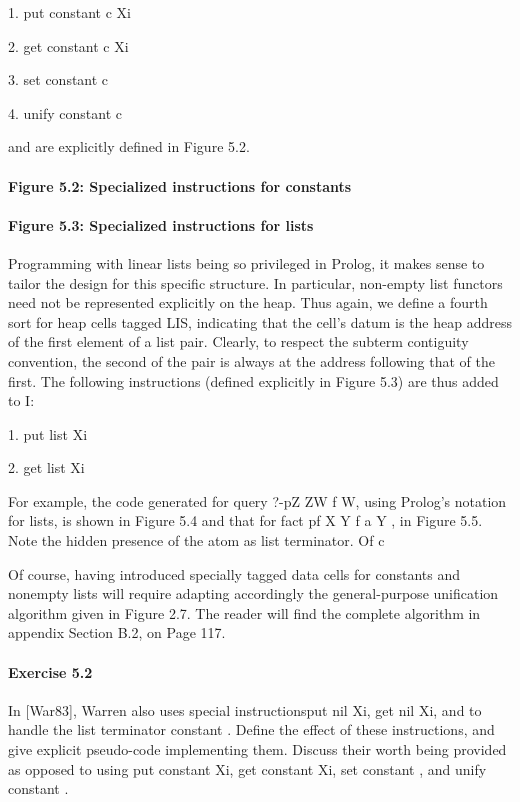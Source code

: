 1. put constant c Xi

2. get constant c Xi

3. set constant c

4. unify constant c

and are explicitly defined in Figure 5.2.

\paragraph{Figure 5.2: Specialized instructions for constants}

\paragraph{Figure 5.3: Specialized instructions for lists}

Programming with linear lists being so privileged in Prolog, it makes sense to
tailor the design for this specific structure. In particular, non-empty list functors
need not be represented explicitly on the heap. Thus again, we define a fourth sort
for heap cells tagged LIS, indicating that the cell’s datum is the heap address of
the first element of a list pair. Clearly, to respect the subterm contiguity convention,
the second of the pair is always at the address following that of the first. The
following instructions (defined explicitly in Figure 5.3) are thus added to I:

1. put list Xi

2. get list Xi

For example, the code generated for query ?-pZ
ZW
f W,
using Prolog’s
notation for lists, is shown in Figure 5.4 and that for fact pf
X
Y
f a
Y ,
in Figure 5.5. Note the hidden presence of the atom  as list terminator.
Of c

Of course, having introduced specially tagged data cells for constants and nonempty
lists will require adapting accordingly the general-purpose unification algorithm
given in Figure 2.7. The reader will find the complete algorithm in appendix
Section B.2, on Page 117.

\paragraph{Exercise 5.2} In [War83], Warren also uses special instructionsput
nil Xi, get nil Xi, and to handle the list terminator constant . Define the effect of these instructions, and give explicit pseudo-code implementing them. Discuss their worth being
provided as opposed to using put constant  Xi, get constant  Xi,
set constant , and unify constant .

